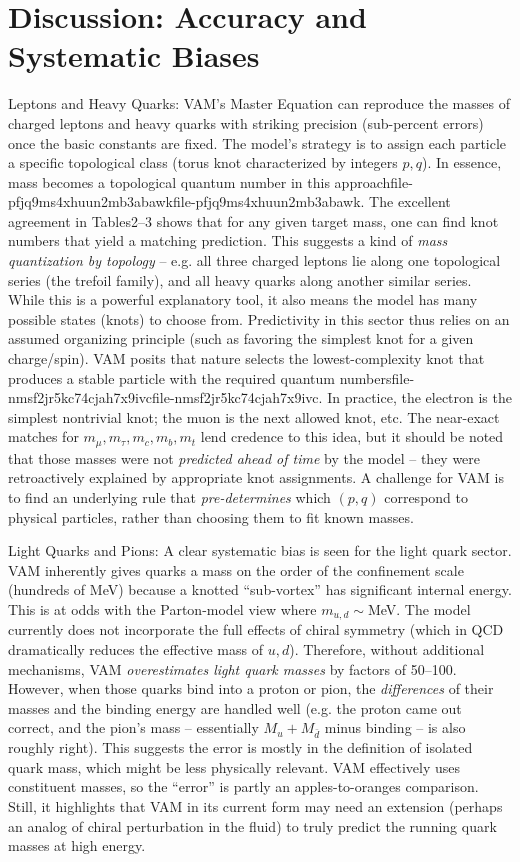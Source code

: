 \section*{Discussion: Accuracy and Systematic Biases}

Leptons and Heavy Quarks: VAM’s Master Equation can reproduce the masses of charged leptons and heavy quarks with striking precision (sub-percent errors) once the basic constants are fixed. The model’s strategy is to assign each particle a specific topological class (torus knot characterized by integers $p,q$). In essence, mass becomes a topological quantum number in this approachfile-pfjq9ms4xhuun2mb3abawkfile-pfjq9ms4xhuun2mb3abawk. The excellent agreement in Tables2–3 shows that for any given target mass, one can find knot numbers that yield a matching prediction. This suggests a kind of \textit{mass quantization by topology} – e.g. all three charged leptons lie along one topological series (the trefoil family), and all heavy quarks along another similar series. While this is a powerful explanatory tool, it also means the model has many possible states (knots) to choose from. Predictivity in this sector thus relies on an assumed organizing principle (such as favoring the simplest knot for a given charge/spin). VAM posits that nature selects the lowest-complexity knot that produces a stable particle with the required quantum numbersfile-nmsf2jr5kc74cjah7x9ivcfile-nmsf2jr5kc74cjah7x9ivc. In practice, the electron is the simplest nontrivial knot; the muon is the next allowed knot, etc. The near-exact matches for $m_\mu, m_\tau, m_c, m_b, m_t$ lend credence to this idea, but it should be noted that those masses were not \textit{predicted ahead of time} by the model – they were retroactively explained by appropriate knot assignments. A challenge for VAM is to find an underlying rule that \textit{pre-determines} which $(p,q)$ correspond to physical particles, rather than choosing them to fit known masses.


Light Quarks and Pions: A clear systematic bias is seen for the light quark sector. VAM inherently gives quarks a mass on the order of the confinement scale (hundreds of MeV) because a knotted “sub-vortex” has significant internal energy. This is at odds with the Parton-model view where $m_{u,d}\sim$MeV. The model currently does not incorporate the full effects of chiral symmetry (which in QCD dramatically reduces the effective mass of $u,d$). Therefore, without additional mechanisms, VAM \textit{overestimates light quark masses} by factors of 50–100. However, when those quarks bind into a proton or pion, the \textit{differences} of their masses and the binding energy are handled well (e.g. the proton came out correct, and the pion’s mass – essentially $M_u + M_{\bar d}$ minus binding – is also roughly right). This suggests the error is mostly in the definition of isolated quark mass, which might be less physically relevant. VAM effectively uses constituent masses, so the “error” is partly an apples-to-oranges comparison. Still, it highlights that VAM in its current form may need an extension (perhaps an analog of chiral perturbation in the fluid) to truly predict the running quark masses at high energy.


